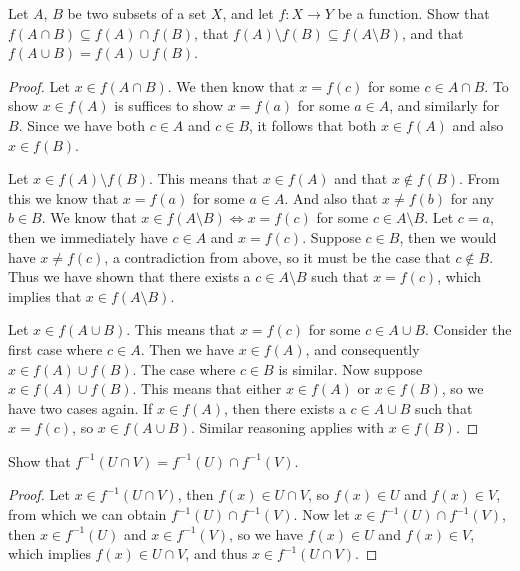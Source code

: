 \documentclass[12pt]{article}
\newenvironment{exercise}[2][Exercise]{\begin{trivlist}
\item[\hskip \labelsep {\bfseries #1}\hskip \labelsep {\bfseries #2}]}{\end{trivlist}}
\begin{document}
\begin{exercise}{3.4.3}
	Let $ A $, $ B $ be two subsets of a set $ X $, and let $ f : X \to Y $ be a function.
	Show that $ f(A \cap B) \subseteq f(A) \cap f(B) $, that $ f(A) \setminus f(B) \subseteq f(A \setminus B) $, and that $ f(A \cup B) = f(A) \cup f(B) $.
\end{exercise}
\begin{proof}
	Let $ x \in f(A \cap B) $.
	We then know that $ x = f(c) $ for some $ c \in A \cap B $.
	To show $ x \in f(A) $ is suffices to show $ x = f(a) $ for some $ a \in A $, and similarly for $ B $.
	Since we have both $ c \in A $ and $ c \in B $, it follows that both $ x \in f(A) $ and also $ x \in f(B) $.
	
	Let $ x \in f(A) \setminus f(B) $.
	This means that $ x \in f(A) $ and that $ x \notin f(B) $.
	From this we know that $ x = f(a) $ for some $ a \in A $.
	And also that $ x \neq f(b) $ for any $ b \in B $.
	We know that $ x \in f(A \setminus B) \iff x = f(c) $ for some $ c \in A \setminus B $.
	Let $ c = a $, then we immediately have $ c \in A $ and $ x = f(c) $.
	Suppose $ c \in B $, then we would have $ x \neq f(c) $, a contradiction from above, so it must be the case that $ c \notin B $.
	Thus we have shown that there exists a $ c \in A \setminus B $ such that $ x = f(c) $, which implies that $ x \in f(A \setminus B) $.
	
	Let $ x \in f(A \cup B) $.
	This means that $ x = f(c) $ for some $ c \in A \cup B $.
	Consider the first case where $ c \in A $.
	Then we have $ x \in f(A) $, and consequently $ x \in f(A) \cup f(B) $.
	The case where $ c \in B $ is similar.
	Now suppose $ x \in f(A) \cup f(B) $.
	This means that either $ x \in f(A) $ or $ x \in f(B) $, so we have two cases again.
	If $ x \in f(A) $, then there exists a $ c \in A \cup B $ such that $ x = f(c) $, so $ x \in f(A \cup B) $.
	Similar reasoning applies with $ x \in f(B) $.
\end{proof}

\begin{exercise}{3.4.4}
	Show that $ f^{-1}(U \cap V) = f^{-1}(U) \cap f^{-1}(V) $.
\end{exercise}
\begin{proof}
	Let $ x \in f^{-1}(U \cap V) $, then $ f(x) \in U \cap V $, so $ f(x) \in U $ and $ f(x) \in V $, from which we can obtain $ f^{-1}(U) \cap f^{-1}(V) $.
	Now let $ x \in f^{-1}(U) \cap f^{-1}(V) $, then $ x \in f^{-1}(U) $ and $ x \in f^{-1}(V) $, so we have $ f(x) \in U $ and $ f(x) \in V $, which implies $ f(x) \in U \cap V $, and thus $ x \in f^{-1}(U \cap V) $.
\end{proof}
\end{document}
